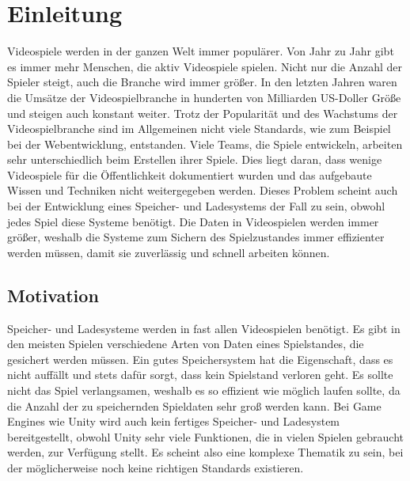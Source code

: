 \chapter{Einleitung}\label{ch:introduction}
Videospiele werden in der ganzen Welt immer populärer. Von Jahr zu Jahr gibt es immer mehr Menschen, die aktiv Videospiele spielen.\cite{explodingtopicsManyGamers} Nicht nur die Anzahl der Spieler steigt, auch die Branche wird immer größer. In den letzten Jahren waren die Umsätze der Videospielbranche in hunderten von Milliarden US-Doller Größe und steigen auch konstant weiter.\cite{statistaUmsatzVideogames} Trotz der Popularität und des Wachstums der Videospielbranche sind im Allgemeinen nicht viele Standards, wie zum Beispiel bei der Webentwicklung, entstanden. Viele Teams, die Spiele entwickeln, arbeiten sehr unterschiedlich beim Erstellen ihrer Spiele. Dies liegt daran, dass wenige Videospiele für die Öffentlichkeit dokumentiert wurden und das aufgebaute Wissen und Techniken nicht weitergegeben werden. Dieses Problem scheint auch bei der Entwicklung eines Speicher- und Ladesystems der Fall zu sein, obwohl jedes Spiel diese Systeme benötigt. Die Daten in Videospielen werden immer größer, weshalb die Systeme zum Sichern des Spielzustandes immer effizienter werden müssen, damit sie zuverlässig und schnell arbeiten können.

\section{Motivation}
Speicher- und Ladesysteme werden in fast allen Videospielen benötigt. Es gibt in den meisten Spielen verschiedene Arten von Daten eines Spielstandes, die gesichert werden müssen. Ein gutes Speichersystem hat die Eigenschaft, dass es nicht auffällt und stets dafür sorgt, dass kein Spielstand verloren geht. Es sollte nicht das Spiel verlangsamen, weshalb es so effizient wie möglich laufen sollte, da die Anzahl der zu speichernden Spieldaten sehr groß werden kann. Bei Game Engines wie Unity wird auch kein fertiges Speicher- und Ladesystem bereitgestellt, obwohl Unity sehr viele Funktionen, die in vielen Spielen gebraucht werden, zur Verfügung stellt. Es scheint also eine komplexe Thematik zu sein, bei der möglicherweise noch keine richtigen Standards existieren. 

